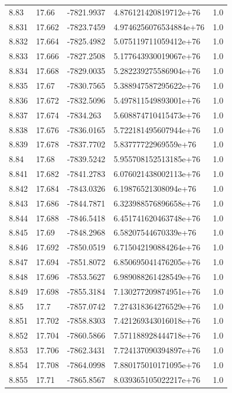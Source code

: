 \begin{tabular}{lllll}
8.83 & 17.66 & -7821.9937 & 4.876121420819712e+76 & 1.0 \\
8.831 & 17.662 & -7823.7459 & 4.9746256076534884e+76 & 1.0 \\
8.832 & 17.664 & -7825.4982 & 5.075119711059412e+76 & 1.0 \\
8.833 & 17.666 & -7827.2508 & 5.177643930019067e+76 & 1.0 \\
8.834 & 17.668 & -7829.0035 & 5.282239275586904e+76 & 1.0 \\
8.835 & 17.67 & -7830.7565 & 5.388947587295622e+76 & 1.0 \\
8.836 & 17.672 & -7832.5096 & 5.497811549893001e+76 & 1.0 \\
8.837 & 17.674 & -7834.263 & 5.608874710415473e+76 & 1.0 \\
8.838 & 17.676 & -7836.0165 & 5.722181495607944e+76 & 1.0 \\
8.839 & 17.678 & -7837.7702 & 5.83777722969559e+76 & 1.0 \\
8.84 & 17.68 & -7839.5242 & 5.955708152513185e+76 & 1.0 \\
8.841 & 17.682 & -7841.2783 & 6.076021438002113e+76 & 1.0 \\
8.842 & 17.684 & -7843.0326 & 6.19876521308094e+76 & 1.0 \\
8.843 & 17.686 & -7844.7871 & 6.323988576896658e+76 & 1.0 \\
8.844 & 17.688 & -7846.5418 & 6.451741620463748e+76 & 1.0 \\
8.845 & 17.69 & -7848.2968 & 6.58207544670339e+76 & 1.0 \\
8.846 & 17.692 & -7850.0519 & 6.715042190884264e+76 & 1.0 \\
8.847 & 17.694 & -7851.8072 & 6.850695041476205e+76 & 1.0 \\
8.848 & 17.696 & -7853.5627 & 6.989088261428549e+76 & 1.0 \\
8.849 & 17.698 & -7855.3184 & 7.130277209874951e+76 & 1.0 \\
8.85 & 17.7 & -7857.0742 & 7.274318364276529e+76 & 1.0 \\
8.851 & 17.702 & -7858.8303 & 7.421269343016018e+76 & 1.0 \\
8.852 & 17.704 & -7860.5866 & 7.571188928444718e+76 & 1.0 \\
8.853 & 17.706 & -7862.3431 & 7.724137090394897e+76 & 1.0 \\
8.854 & 17.708 & -7864.0998 & 7.880175010171095e+76 & 1.0 \\
8.855 & 17.71 & -7865.8567 & 8.039365105022217e+76 & 1.0 \\

\end{tabular}
